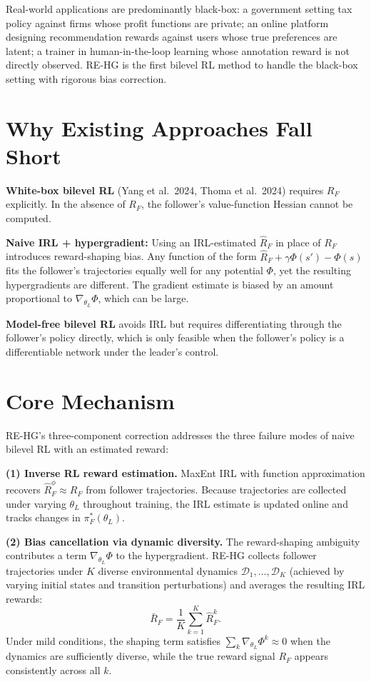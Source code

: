\documentclass[10pt,twocolumn]{article}
\begin{document}
Real-world applications are predominantly black-box: a government setting tax
policy against firms whose profit functions are private; an online platform
designing recommendation rewards against users whose true preferences are latent;
a trainer in human-in-the-loop learning whose annotation reward is not
directly observed. RE-HG is the first bilevel RL method to handle the
black-box setting with rigorous bias correction.

\section{Why Existing Approaches Fall Short}

\textbf{White-box bilevel RL} (Yang et al.\ 2024, Thoma et al.\ 2024) requires
$R_F$ explicitly. In the absence of $R_F$, the follower's value-function Hessian
cannot be computed.

\textbf{Naive IRL + hypergradient:} Using an IRL-estimated $\hat{R}_F$ in place
of $R_F$ introduces reward-shaping bias. Any function of the form
$\hat{R}_F + \gamma\Phi(s') - \Phi(s)$ fits the follower's trajectories equally
well for any potential $\Phi$, yet the resulting hypergradients are different.
The gradient estimate is biased by an amount proportional to $\nabla_{\theta_L}\Phi$,
which can be large.

\textbf{Model-free bilevel RL} avoids IRL but requires differentiating through
the follower's policy directly, which is only feasible when the follower's policy
is a differentiable network under the leader's control.

\section{Core Mechanism}

RE-HG's three-component correction addresses the three failure modes of naive
bilevel RL with an estimated reward:

\textbf{(1) Inverse RL reward estimation.} MaxEnt IRL with function approximation
recovers $\hat{R}_F^\phi \approx R_F$ from follower trajectories. Because
trajectories are collected under varying $\theta_L$ throughout training, the IRL
estimate is updated online and tracks changes in $\pi_F^*(\theta_L)$.

\textbf{(2) Bias cancellation via dynamic diversity.} The reward-shaping
ambiguity contributes a term $\nabla_{\theta_L} \Phi$ to the hypergradient.
RE-HG collects follower trajectories under $K$ diverse environmental dynamics
$\mathcal{D}_1, \ldots, \mathcal{D}_K$ (achieved by varying initial states and
transition perturbations) and averages the resulting IRL rewards:
\[
  \bar{R}_F = \frac{1}{K}\sum_{k=1}^K \hat{R}_F^k.
\]
Under mild conditions, the shaping term satisfies $\sum_k \nabla_{\theta_L} \Phi^k
\approx 0$ when the dynamics are sufficiently diverse, while the true reward
signal $R_F$ appears consistently across all $k$.
\end{document}
